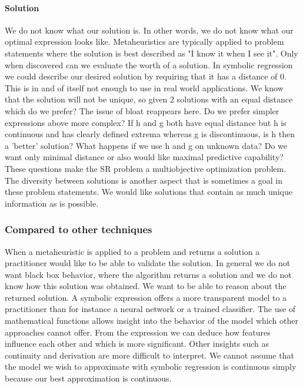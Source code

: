 \paragraph{Solution}
We do not know what our solution is. In other words, we do not know what our optimal expression looks like. Metaheuristics are typically applied to problem statements where the solution is best described as "I know it when I see it". Only when discovered can we evaluate the worth of a solution. In symbolic regression we could describe our desired solution by requiring that it has a distance of 0. This is in and of itself not enough to use in real world applications. We know that the solution will not be unique, so given 2 solutions with an equal distance which do we prefer? The issue of bloat reappears here. Do we prefer simpler expressions above more complex? If h and g both have equal distance but h is continuous and has clearly defined extrema whereas g is discontinuous, is h then a 'better' solution? What happens if we use h and g on unknown data? Do we want only minimal distance or also would like maximal predictive capability? These questions make the SR problem a multiobjective optimization problem. The diversity between solutions is another aspect that is sometimes a goal in these problem statements. We would like solutions that contain as much unique information as is possible. 

\subsubsection{Compared to other techniques}
When a metaheuristic is applied to a problem and returns a solution a practitioner would like to be able to validate the solution. In general we do not want black box behavior, where the algorithm returns a solution and we do not know how this solution was obtained. We want to be able to reason about the returned solution. A symbolic expression offers a more transparent model to a practitioner than for instance a neural network or a trained classifier. The use of mathematical functions allows insight into the behavior of the model which other approaches cannot offer. From the expression we can deduce how features influence each other and which is more significant. Other insights such as continuity and derivation are more difficult to interpret. We cannot assume that the model we wish to approximate with symbolic regression is continuous simply because our best approximation is continuous.

